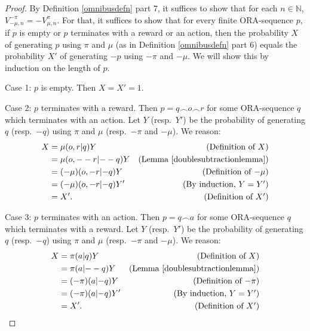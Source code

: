 \documentclass{article}
\begin{document}
\begin{proof}
    By Definition \ref{omnibusdefn} part 7,
    it suffices to show that for each $n\in\mathbb N$,
    $V^{-\pi}_{-\mu,n}=-V^\pi_{\mu,n}$.
    For that, it suffices to show that for every finite ORA-sequence
    $p$, if $p$ is empty or $p$ terminates with a reward or an action, then
    the probability $X$ of generating $p$ using $\pi$ and $\mu$
    (as in Definition \ref{omnibusdefn} part 6)
    equals the probability $X'$ of generating $-p$
    using $-\pi$ and $-\mu$. We will show this by induction on the length of $p$.

    Case 1: $p$ is empty. Then $X=X'=1$.

    Case 2: $p$ terminates with a reward.
    Then $p=q\frown o \frown r$
    for some ORA-sequence $q$ which terminates with an action.
    Let $Y$ (resp.\ $Y'$) be the probability of generating $q$
    (resp.\ $-q$)
    using $\pi$ and $\mu$ (resp.\ $-\pi$ and $-\mu$). We reason:
    \begin{align*}
        X &= \mu(o,r|q)Y
            &\mbox{(Definition of $X$)}\\
          &= \mu(o,--r| {--q})Y
            &\mbox{(Lemma \ref{doublesubtractionlemma})}\\
          &= (-\mu)(o,-r| {-q})Y
            &\mbox{(Definition of $-\mu$)}\\
          &= (-\mu)(o,-r| {-q})Y'
            &\mbox{(By induction, $Y=Y'$)}\\
          &= X'. &\mbox{(Definition of $X'$)}
    \end{align*}

    Case 3: $p$ terminates with an action.
    Then $p=q\frown a$ for some ORA-sequence $q$ which terminates with a reward.
    Let $Y$ (resp.\ $Y'$) be the probability of generating $q$
    (resp.\ $-q$)
    using $\pi$ and $\mu$ (resp.\ $-\pi$ and $-\mu$). We reason:
    \begin{align*}
        X &= \pi(a|q)Y
            &\mbox{(Definition of $X$)}\\
          &= \pi(a|{--q})Y
            &\mbox{(Lemma \ref{doublesubtractionlemma})}\\
          &= (-\pi)(a|{-q})Y
            &\mbox{(Definition of $-\pi$)}\\
          &= (-\pi)(a|{-q})Y'
            &\mbox{(By induction, $Y=Y'$)}\\
          &= X'. &\mbox{(Definition of $X'$)}
    \end{align*}
\end{proof}
\end{document}
